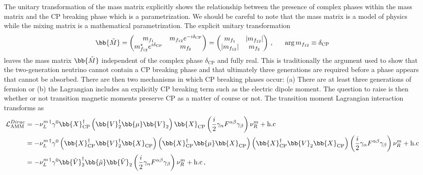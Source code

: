 The unitary transformation of the mass matrix explicitly shows the relationship between the presence of complex phases within the mass matrix and the CP breaking phase which is a parametrization. We should be careful to note that the mass matrix is a model of physics while the mixing matrix is a mathematical parametrization. The explicit unitary transformation
\begin{alignat}{1}
	\label{cp:eq:05c} \bb{\tilde{M}} = 
	\begin{pmatrix}
		m_{f_{1}}&m_{f_{12}}e^{-i\delta_{\mathrm{CP}}}\\
		m_{f_{12}}^{*}e^{i\delta_{\mathrm{CP}}}&m_{f_{2}}
	\end{pmatrix}=
	\begin{pmatrix}
		m_{f_{1}}&|m_{f_{12}}|\\
		|m_{f_{12}}|&m_{f_{2}}
	\end{pmatrix}\,,\indent \arg{m_{f_{12}}}\equiv\delta_{\mathrm{CP}}
\end{alignat}
leaves the mass matrix $\bb{\tilde{M}}$ independent of the complex phase $\delta_{\mathrm{CP}}$ and fully real. This is traditionally the argument used to show that the two-generation neutrino cannot contain a CP breaking phase and that ultimately three generations are required before a phase appears that cannot be absorbed. There are then two mechanisms in which CP breaking phases occur: (a) There are at least three generations of fermion or (b) the Lagrangian includes an explicitly CP breaking term such as the electric dipole moment. The question to raise is then whether or not transition magnetic moments preserve CP as a matter of course or not. The transition moment Lagrangian interaction transforms as
\begin{alignat}{1}
	\notag \mathcal{L}_{\mathrm{AMM}}^{Dirac}&=-\nu_{L}^{m\, \dagger}\gamma^{0}\bb{X}_{\mathrm{CP}}^{\dagger}\left(\bb{V}^{\dagger}_{2}\bb{\mu}\bb{V}_{2}\right)\bb{X}_{\mathrm{CP}}\left(\frac{i}{2}\gamma_{\alpha}F^{\alpha\beta}\gamma_{\beta}\right)\nu_{R}^{m}+\mathrm{h.c}\\
	\notag &=-\nu_{L}^{m\, \dagger}\gamma^{0}\left(\bb{X}_{\mathrm{CP}}^{\dagger}\bb{V}^{\dagger}_{2}\bb{X}_{\mathrm{CP}}\right)\left(\bb{X}_{\mathrm{CP}}^{\dagger}\bb{\mu}\bb{X}_{\mathrm{CP}}\right)\left(\bb{X}_{\mathrm{CP}}^{\dagger}\bb{V}_{2}\bb{X}_{\mathrm{CP}}\right)\left(\frac{i}{2}\gamma_{\alpha}F^{\alpha\beta}\gamma_{\beta}\right)\nu_{R}^{m}+\mathrm{h.c}\\
	\label{cp:eq:06a} &=-\nu_{L}^{m\, \dagger}\gamma^{0}\bb{\tilde{V}}^{\dagger}_{2}\bb{\tilde{\mu}}\bb{\tilde{V}}_{2}\left(\frac{i}{2}\gamma_{\alpha}F^{\alpha\beta}\gamma_{\beta}\right)\nu_{R}^{m}+\mathrm{h.c}\,,
\end{alignat}
